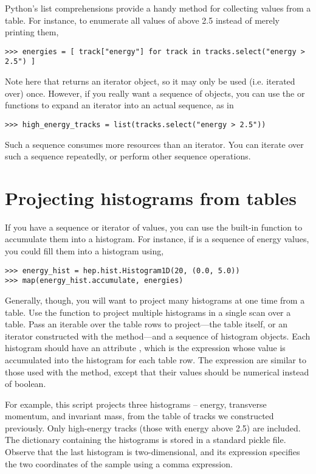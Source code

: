 Python's list comprehensions provide a handy method for collecting
values from a table.  For instance, to enumerate all values of
 above 2.5 instead of merely printing them,
\begin{verbatim}
>>> energies = [ track["energy"] for track in tracks.select("energy > 2.5") ]
\end{verbatim}
Note here that  returns an iterator
object, so it may only be used (i.e. iterated over) once.  However, if
you really want a sequence of  objects, you can use the
 or  functions to expand an iterator into
an actual sequence, as in
\begin{verbatim}
>>> high_energy_tracks = list(tracks.select("energy > 2.5"))
\end{verbatim}
Such a sequence consumes more resources than an iterator.  You can
iterate over such a sequence repeatedly, or perform other sequence
operations. 

 
\section{Projecting histograms from tables}

If you have a sequence or iterator of values, you can use the built-in
 function to accumulate them into a histogram.  For
instance, if  is a sequence of energy values, you could
fill them into a histogram using,
\begin{verbatim}
>>> energy_hist = hep.hist.Histogram1D(20, (0.0, 5.0))
>>> map(energy_hist.accumulate, energies)
\end{verbatim}

Generally, though, you will want to project many histograms at one time
from a table.  Use the  function to project
multiple histograms in a single scan over a table.  Pass an iterable
over the table rows to project---the table itself, or an iterator
constructed with the  method---and a sequence of
histogram objects.  Each histogram should have an attribute
, which is the expression whose value is accumulated
into the histogram for each table row.  The expression are similar to
those used with the  method, except that their values
should be numerical instead of boolean.

For example, this script projects three histograms -- energy, transverse
momentum, and invariant mass, from the table of tracks we constructed
previously.  Only high-energy tracks (those with energy above 2.5) are
included.  The dictionary containing the histograms is stored in a
standard pickle file.
Observe that the last histogram is two-dimensional, and its expression
specifies the two coordinates of the sample using a comma expression.

